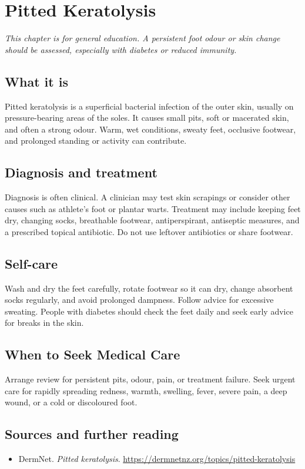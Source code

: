\chapter{Pitted Keratolysis}

\medskip
\noindent\textit{This chapter is for general education. A persistent foot odour or skin change should be assessed, especially with diabetes or reduced immunity.}

\section*{What it is}
Pitted keratolysis is a superficial bacterial infection of the outer skin, usually on pressure-bearing areas of the soles. It causes small pits, soft or macerated skin, and often a strong odour. Warm, wet conditions, sweaty feet, occlusive footwear, and prolonged standing or activity can contribute.

\section*{Diagnosis and treatment}
Diagnosis is often clinical. A clinician may test skin scrapings or consider other causes such as athlete’s foot or plantar warts. Treatment may include keeping feet dry, changing socks, breathable footwear, antiperspirant, antiseptic measures, and a prescribed topical antibiotic. Do not use leftover antibiotics or share footwear.

\section*{Self-care}
Wash and dry the feet carefully, rotate footwear so it can dry, change absorbent socks regularly, and avoid prolonged dampness. Follow advice for excessive sweating. People with diabetes should check the feet daily and seek early advice for breaks in the skin.

\section*{When to Seek Medical Care}
Arrange review for persistent pits, odour, pain, or treatment failure. Seek urgent care for rapidly spreading redness, warmth, swelling, fever, severe pain, a deep wound, or a cold or discoloured foot.

\section*{Sources and further reading}
\begin{itemize}
\item DermNet. \textit{Pitted keratolysis}. \url{https://dermnetnz.org/topics/pitted-keratolysis}
\end{itemize}
